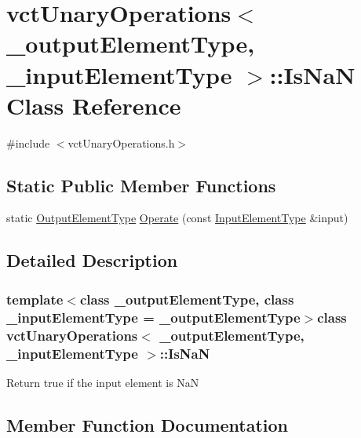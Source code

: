 \hypertarget{classvct_unary_operations_1_1_is_na_n}{}\section{vct\+Unary\+Operations$<$ \+\_\+output\+Element\+Type, \+\_\+input\+Element\+Type $>$\+:\+:Is\+Na\+N Class Reference}
\label{classvct_unary_operations_1_1_is_na_n}


{\ttfamily \#include $<$vct\+Unary\+Operations.\+h$>$}

\subsection*{Static Public Member Functions}
\begin{DoxyCompactItemize}
\item 
static \hyperlink{classvct_unary_operations_a42306ac3dd20d32c6d6c66ac3fa2e7b9}{Output\+Element\+Type} \hyperlink{classvct_unary_operations_1_1_is_na_n_ac8092f9ed074f6770d7bc7bd5aead3dd}{Operate} (const \hyperlink{classvct_unary_operations_abf3b77bb7b8abd7ba72a6a45a65696a7}{Input\+Element\+Type} \&input)
\end{DoxyCompactItemize}


\subsection{Detailed Description}
\subsubsection*{template$<$class \+\_\+output\+Element\+Type, class \+\_\+input\+Element\+Type = \+\_\+output\+Element\+Type$>$class vct\+Unary\+Operations$<$ \+\_\+output\+Element\+Type, \+\_\+input\+Element\+Type $>$\+::\+Is\+Na\+N}

Return true if the input element is Na\+N 

\subsection{Member Function Documentation}
\hypertarget{classvct_unary_operations_1_1_is_na_n_ac8092f9ed074f6770d7bc7bd5aead3dd}{}
